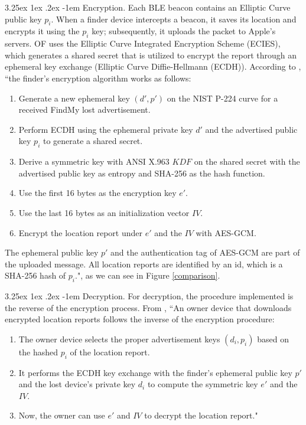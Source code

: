 \documentclass[english]{article}
\makeatletter
\renewcommand\paragraph{\@startsection{paragraph}{5}{\z@}%
  {3.25ex \@plus1ex \@minus.2ex}%
  {-1em}%
  {\normalfont\normalsize\bfseries}}
\makeatother
\begin{document}
\paragraph{Encryption.}
Each BLE beacon contains an Elliptic Curve public key $p_i$. When a finder device intercepts a beacon, it saves its location and encrypts it using the $p_i$ key; subsequently, it uploads the packet to Apple's servers.
OF uses the Elliptic Curve Integrated Encryption Scheme (ECIES), which generates a shared secret that is utilized to encrypt the report through an ephemeral key exchange (Elliptic Curve Diffie-Hellmann (ECDH)). According to \cite{whocanfind}, ``the finder’s encryption algorithm works as follows:
\begin{enumerate}
  \item Generate a new ephemeral key $(d', p')$ on the NIST P-224 curve for a received FindMy lost advertisement.
  \item Perform ECDH using the ephemeral private key $d'$ and the advertised public key $p_i$ to generate a shared secret.
  \item Derive a symmetric key with ANSI X.963 $KDF$ on the shared secret with the advertised public key as entropy and SHA-256 as the hash function.
  \item Use the first 16 bytes as the encryption key $e'$.
  \item Use the last 16 bytes as an initialization vector $IV$.
  \item Encrypt the location report under $e'$ and the $IV$ with AES-GCM. 
\end{enumerate} 
The ephemeral public key $p'$ and the authentication tag of AES-GCM are part of the uploaded message. All location reports are identified by
an id, which is a SHA-256 hash of $p_i$.", as we can see in Figure \ref{comparison}.

\paragraph{Decryption.}
For decryption, the procedure implemented is the reverse of the encryption process. From \cite{whocanfind}, ``An owner device that downloads encrypted location reports follows the inverse of the encryption procedure:
\begin{enumerate}
  \item The owner device selects the proper advertisement keys $(d_i, p_i)$ based on the hashed $p_i$ of the location report.
  \item It performs the ECDH key exchange with the finder’s ephemeral public key $p'$ and the lost device’s private key $d_i$ to compute the symmetric key $e'$ and the $IV$.
  \item Now, the owner can use $e'$ and $IV$ to decrypt the location report."
\end{enumerate}
\end{document}
